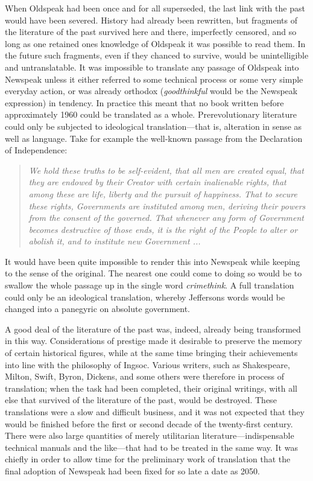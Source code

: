 When Oldspeak had been once and for all superseded, the last link with
the past would have been severed. History had already been rewritten,
but fragments of the literature of the past survived here and there,
imperfectly censored, and so long as one retained one\textquotesingle s
knowledge of Oldspeak it was possible to read them. In the future such
fragments, even if they chanced to survive, would be unintelligible and
untranslatable. It was impossible to translate any passage of Oldspeak
into Newspeak unless it either referred to some technical process or
some very simple everyday action, or was already orthodox
(\emph{goodthinkful} would be the Newspeak expression) in tendency. In
practice this meant that no book written before approximately 1960 could
be translated as a whole. Prerevolutionary literature could only be
subjected to ideological translation---that is, alteration in sense as
well as language. Take for example the well-known passage from the
Declaration of Independence:

\begin{quotation}
\emph{We hold these truths to be self-evident, that all men are created
equal, that they are endowed by their Creator with certain inalienable
rights, that among these are life, liberty and the pursuit of happiness.
That to secure these rights, Governments are instituted among men,
deriving their powers from the consent of the governed. That whenever
any form of Government becomes destructive of those ends, it is the
right of the People to alter or abolish it, and to institute new
Government ...}
\end{quotation}

It would have been quite impossible to render this into Newspeak while
keeping to the sense of the original. The nearest one could come to
doing so would be to swallow the whole passage up in the single word
\emph{crimethink}. A full translation could only be an ideological
translation, whereby Jefferson\textquotesingle s words would be changed
into a panegyric on absolute government.

A good deal of the literature of the past was, indeed, already being
transformed in this way. Considerations of prestige made it desirable to
preserve the memory of certain historical figures, while at the same
time bringing their achievements into line with the philosophy of
Ingsoc. Various writers, such as Shakespeare, Milton, Swift, Byron,
Dickens, and some others were therefore in process of translation; when
the task had been completed, their original writings, with all else that
survived of the literature of the past, would be destroyed. These
translations were a slow and difficult business, and it was not expected
that they would be finished before the first or second decade of the
twenty-first century. There were also large quantities of merely
utilitarian literature---indispensable technical manuals and the
like---that had to be treated in the same way. It was chiefly in order
to allow time for the preliminary work of translation that the final
adoption of Newspeak had been fixed for so late a date as 2050.
